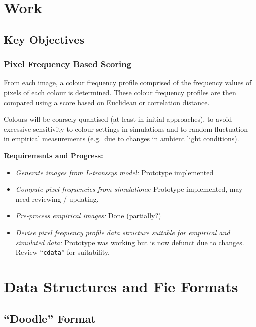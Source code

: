 \documentclass[a4paper,fleqn]{article}
\begin{document}
\section{Work}

\subsection{Key Objectives}

\subsubsection{Pixel Frequency Based Scoring}

From each image, a colour frequency profile comprised of the frequency
values of pixels of each colour is determined. These colour frequency
profiles are then compared using a score based on Euclidean or
correlation distance.

Colours will be coarsely quantised (at least in initial approaches),
to avoid excessive sensitivity to colour settings in simulations
and to random fluctuation in empirical measurements (e.g.\ due to
changes in ambient light conditions).


\textbf{Requirements and Progress:}

\begin{itemize}
\item \textit{Generate images from L-transsys model:} Prototype
implemented
\item \textit{Compute pixel frequencies from simulations:} Prototype
  implemented, may need reviewing / updating.
\item \textit{Pre-process empirical images:} Done (partially?)
\item \textit{Devise pixel frequency profile data structure suitable
    for empirical and simulated data:} Prototype was working but is
  now defunct due to changes. Review ``\texttt{cdata}'' for
  suitability.
\end{itemize}


\appendix

\section{Data Structures and Fie Formats}

\subsection{``Doodle'' Format}
\end{document}

